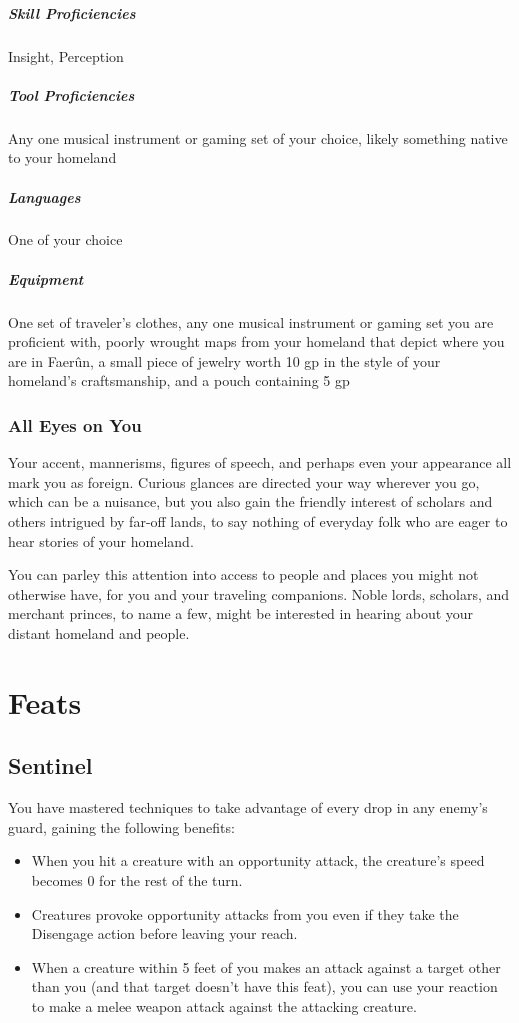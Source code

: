 \documentclass[letterpaper,justified,openany,oneside,twocolumn]{dndbook}
\begin{document}
\subparagraph*{Skill Proficiencies} Insight, Perception
\subparagraph*{Tool Proficiencies} Any one musical instrument or gaming set of your choice, likely something native to your homeland
\subparagraph*{Languages} One of your choice
\subparagraph*{Equipment} One set of traveler's clothes, any one musical instrument or gaming set you are proficient with, poorly wrought maps from your homeland that depict where you are in Faerûn, a small piece of jewelry worth 10 gp in the style of your homeland's craftsmanship, and a pouch containing 5 gp

\subsubsection*{All Eyes on You}
Your accent, mannerisms, figures of speech, and perhaps even your appearance all mark you as foreign. Curious glances are directed your way wherever you go, which can be a nuisance, but you also gain the friendly interest of scholars and others intrigued by far-off lands, to say nothing of everyday folk who are eager to hear stories of your homeland.

You can parley this attention into access to people and places you might not otherwise have, for you and your traveling companions. Noble lords, scholars, and merchant princes, to name a few, might be interested in hearing about your distant homeland and people.


\section*{Feats}
\subsection*{Sentinel}
You have mastered techniques to take advantage of every drop in any enemy's guard, gaining the following benefits:
\begin{itemize}
    \item When you hit a creature with an opportunity attack, the creature's speed becomes 0 for the rest of the turn.
    \item Creatures provoke opportunity attacks from you even if they take the Disengage action before leaving your reach.
    \item When a creature within 5 feet of you makes an attack against a target other than you (and that target doesn't have this feat), you can use your reaction to make a melee weapon attack against the attacking creature.
\end{itemize}
\end{document}
